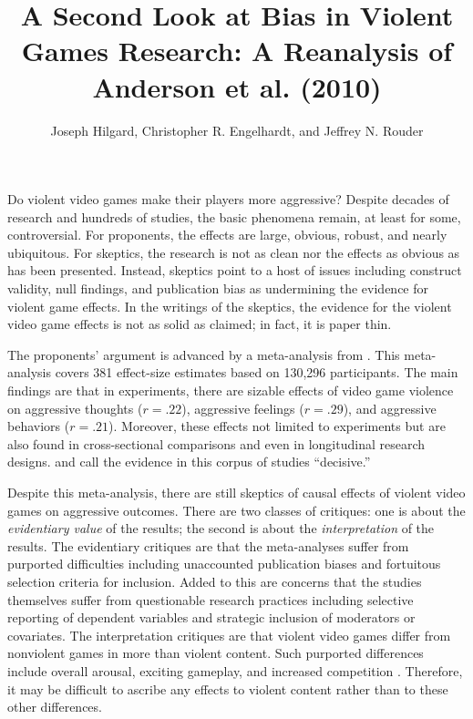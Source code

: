 \documentclass[man]{apa6}
\author{Joseph Hilgard, Christopher R. Engelhardt, and Jeffrey N. Rouder}
\title{A Second Look at Bias in Violent Games Research: A Reanalysis of Anderson et al. (2010)}
\affiliation{University of Missouri}
\begin{document}
\maketitle


Do violent video games make their players more aggressive? Despite decades of research and hundreds of studies, the basic phenomena remain, at least for some, controversial.  For proponents, the effects are large, obvious, robust, and nearly ubiquitous.  For skeptics, the research is not as clean nor the effects as obvious as has been presented.  Instead, skeptics point to a host of issues including construct validity, null findings, and publication bias as undermining the evidence for violent game effects.  In the writings of the skeptics, the evidence for the violent video game effects is not as solid as claimed; in fact, it is paper thin.

The proponents' argument is advanced by a meta-analysis from \citet{Anderson:etal:2010}.  This meta-analysis covers 381 effect-size estimates based on 130,296 participants.  The main findings are that in experiments, there are sizable effects of video game violence on aggressive thoughts ($r = .22$),  aggressive feelings ($r = .29$), and aggressive behaviors ($r = .21$).  Moreover, these effects not limited to experiments but are also found in cross-sectional comparisons and even in longitudinal research designs. \citet{Bushman:etal:2010} and \citet{Huesmann:2010} call the evidence in this corpus of studies ``decisive.'' 

Despite this meta-analysis, there are still skeptics of causal effects of violent video games on aggressive outcomes.  There are two classes of critiques: one is about the {\em evidentiary value} of the results; the second is about the {\em interpretation} of the results. The evidentiary critiques are that the meta-analyses suffer from purported difficulties including unaccounted publication biases and fortuitous selection criteria for inclusion.  Added to this are concerns that the studies themselves suffer from questionable research practices including selective reporting of dependent variables and strategic inclusion of moderators or covariates.   The interpretation critiques are that violent video games differ from nonviolent games in more than violent content.  Such purported differences include overall arousal, exciting gameplay, and increased competition \citep{Adachi:Willoughby:2011,Elson:etal:2013}.  Therefore, it may be difficult to ascribe any effects to violent content rather than to these other differences.   
\end{document}
